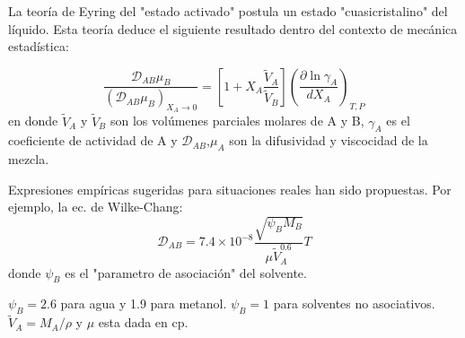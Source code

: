 La teoría de Eyring del "estado activado" postula un estado "cuasicristalino" del líquido. Esta teoría deduce el siguiente resultado dentro del contexto de mecánica estadística:

\begin{equation}
\frac{\mathscr{D}_{AB} \mu_B}{(\mathscr{D}_{AB}\mu_B)_{X_A \to 0}} = \left[ 1 + X_A \frac{\widetilde{V}_A}{\widetilde{V}_B} \right] \left( \frac{\partial \ln \gamma_{A}}{d X_A} \right)_{T,P}\tag{1.61}\label{eq_1.61}
\end{equation}
en donde $\widetilde{V}_A$ y $\widetilde{V}_B$ son los volúmenes parciales molares de A y B, $\gamma_A$ es el coeficiente de actividad de A y $\mathscr{D}_{AB}$,$\mu_A$ son la difusividad y viscocidad de la mezcla.

Expresiones empíricas sugeridas para situaciones reales han sido propuestas. Por ejemplo, la ec. de Wilke-Chang:
\begin{equation}
    \mathscr{D}_{AB}=7.4\times10^{-8}\frac{\sqrt{\psi_BM_B}}{\mu \widetilde{V}_A^{0.6}}T
\tag{1.62}\label{eq_1.62}
\end{equation}
donde $\psi_B$ es el "parametro de asociación" del solvente.

$\psi_B=2.6$ para agua y 1.9 para metanol.
$\psi_B=1$ para solventes no asociativos. $\widetilde{V}_A=M_A/\rho$ y $\mu$ esta dada en cp.



  

